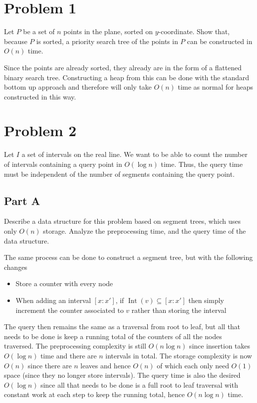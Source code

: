 \documentclass[12pt]{extarticle}
\begin{document}
\section*{Problem 1}
Let $P$ be a set of $n$ points in the plane, sorted on $y$-coordinate. Show that, because $P$ is sorted, a priority search tree of the points in $P$ can be constructed in $O(n)$ time.

\begin{solution}
    Since the points are already sorted, they already are in the form of a flattened binary search tree. Constructing a heap from this can be done with the standard bottom up approach and therefore will only take $O(n)$ time as normal for heaps constructed in this way.
\end{solution}

\section*{Problem 2}
Let $I$ a set of intervals on the real line. We want to be able to count the number of intervals containing a query point in $O(\log n)$ time. Thus, the query time must be independent of the number of segments containing the query point.

\subsection*{Part A}
Describe a data structure for this problem based on segment trees, which uses only $O(n)$ storage. Analyze the preprocessing time, and the query time of the data structure.

\begin{solution}
    The same process can be done to construct a segment tree, but with the following changes
    \begin{itemize}
        \item Store a counter with every node
        \item When adding an interval $[x : x']$, if $\operatorname{Int}(v) \subseteq [x : x']$  then simply increment the counter associated to $v$ rather than storing the interval
    \end{itemize}
    The query then remains the same as a traversal from root to leaf, but all that needs to be done is keep a running total of the counters of all the nodes traversed. The preprocessing complexity is still $O(n \log n)$ since insertion takes $O(\log n)$ time and there are $n$ intervals in total. The storage complexity is now $O(n)$ since there are $n$ leaves and hence $O(n)$ of which each only need $O(1)$ space (since they no longer store intervals). The query time is also the desired $O(\log n)$ since all that needs to be done is a full root to leaf traversal with constant work at each step to keep the running total, hence $O(n \log n)$ time.
\end{solution}
\end{document}
